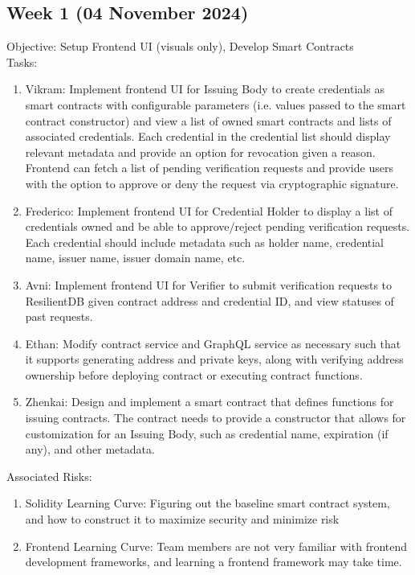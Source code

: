 \subsection{Week 1 (04 November 2024)}
Objective: Setup Frontend UI (visuals only), Develop Smart Contracts \\
Tasks: 
\begin{enumerate}
    \item Vikram: Implement frontend UI for Issuing Body to create credentials as smart contracts with configurable parameters (i.e. values passed to the smart contract constructor) and view a list of owned smart contracts and lists of associated credentials. Each credential in the credential list should display relevant metadata and provide an option for revocation given a reason. Frontend can fetch a list of pending verification requests and provide users with the option to approve or deny the request via cryptographic signature.
    \item Frederico: Implement frontend UI for Credential Holder to display a list of credentials owned and be able to approve/reject pending verification requests. Each credential should include metadata such as holder name, credential name, issuer name, issuer domain name, etc.
    \item Avni: Implement frontend UI for Verifier to submit verification requests to ResilientDB given contract address and credential ID, and view statuses of past requests.
    \item Ethan: Modify contract service and GraphQL service as necessary such that it supports generating
    address and private keys, along with verifying address ownership before deploying contract or executing contract functions.
    \item Zhenkai: Design and implement a smart contract that defines functions for issuing contracts. The contract needs to provide a constructor that allows for customization for an Issuing Body, such as credential name, expiration (if any), and other metadata.
\end{enumerate}
Associated Risks:
\begin{enumerate}
    \item Solidity Learning Curve: Figuring out the baseline smart contract system, and how to construct it to maximize security and minimize risk
    \item Frontend Learning Curve: Team members are not very familiar with frontend development frameworks, and learning a frontend framework may take time.
\end{enumerate}

